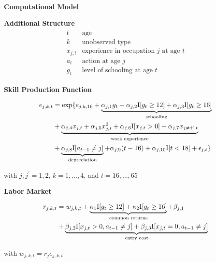 \begin{frame}\begin{center}
\LARGE\textbf{Computational Model}
\end{center}\end{frame}
\begin{frame}
\textbf{Additional Structure}
\begin{align*}\begin{array}{ll}
t & \text{age} \\
k       & \text{unobserved type} \\
x_{j,t} & \text{experience in occupation $j$ at age $t$} \\
a_t     & \text{action at age $j$} \\
g_t     & \text{level of schooling at age $t$}
\end{array}\end{align*}
\end{frame}
\begin{frame}

\textbf{Skill Production Function}

\begin{align*}
e_{j,k,t} & =  \exp\{ e_{j,k,16}+ \underbrace{\alpha_{j,1} g_t + \alpha_{j,2} \mathrm{I}[g_t \geq 12] + \alpha_{j,3} \mathrm{I}[g_t \geq 16]}_{\text{schooling}}\\
                & + \underbrace{\alpha_{j,4} x_{j,t} + \alpha_{j,5} x^2_{j, t} + \alpha_{j,6} \mathrm{I}[x_{j, t} > 0] + \alpha_{j,7} x_{j\neq j^\prime, t}}_{\text{work experience}}  \\
                & + \underbrace{\alpha_{j,8}\mathrm{I}[a_{t - 1} \neq j] }_{\text{depreciation}} + \alpha_{j,9} (t - 16) + \alpha_{j,10} \mathrm{I}[t < 18] + \epsilon_{j, t}\}
\end{align*}

with $j, j^\prime = 1, 2$, $k = 1, \hdots,4$, and $t=16,\hdots,65$

\end{frame}
\begin{frame}

\textbf{Labor Market}

\begin{align*}
r_{j,k,t} & =   w_{j,k,t} + \underbrace{\kappa_{1}\mathrm{I}[g_t \geq 12] + \kappa_{2} \mathrm{I}[g_t \geq 16]}_{\text{common returns}} + \beta_{j,1} \\
          & + \underbrace{\beta_{j,2}\mathrm{I}[x_{j,t} > 0, a_{t-1}\neq j] + \beta_{j,3}\mathrm{I}[x_{j, t} = 0, a_{t-1}\neq j ]}_{\text{entry cost}}
\end{align*}

with $w_{j,k, t} = r_j e_{j,k,t}$
\end{frame}
